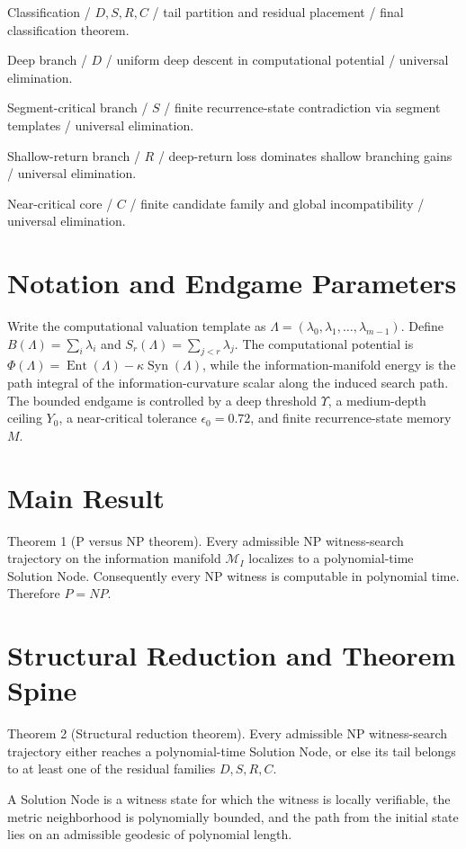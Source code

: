 \documentclass[11pt]{article}
\theoremstyle{definition}
\begin{document}
Classification / $D,S,R,C$ / tail partition and residual placement / final classification theorem.

Deep branch / $D$ / uniform deep descent in computational potential / universal elimination.

Segment-critical branch / $S$ / finite recurrence-state contradiction via segment templates / universal elimination.

Shallow-return branch / $R$ / deep-return loss dominates shallow branching gains / universal elimination.

Near-critical core / $C$ / finite candidate family and global incompatibility / universal elimination.
\section{Notation and Endgame Parameters}
Write the computational valuation template as $\Lambda=(\lambda_0,\lambda_1,\dots,\lambda_{m-1})$. Define $B(\Lambda)=\sum_i \lambda_i$ and $S_r(\Lambda)=\sum_{j<r}\lambda_j$. The computational potential is $\Phi(\Lambda)=\operatorname{Ent}(\Lambda)-\kappa\operatorname{Syn}(\Lambda)$, while the information-manifold energy is the path integral of the information-curvature scalar along the induced search path. The bounded endgame is controlled by a deep threshold $\Upsilon$, a medium-depth ceiling $Y_0$, a near-critical tolerance $\epsilon_0=0.72$, and finite recurrence-state memory $M$.
\section{Main Result}
Theorem 1 (P versus NP theorem). Every admissible NP witness-search trajectory on the information manifold $\mathcal{M}_I$ localizes to a polynomial-time Solution Node. Consequently every NP witness is computable in polynomial time. Therefore $P=NP$.
\section{Structural Reduction and Theorem Spine}
Theorem 2 (Structural reduction theorem). Every admissible NP witness-search trajectory either reaches a polynomial-time Solution Node, or else its tail belongs to at least one of the residual families $D,S,R,C$.

A Solution Node is a witness state for which the witness is locally verifiable, the metric neighborhood is polynomially bounded, and the path from the initial state lies on an admissible geodesic of polynomial length.
\end{document}
